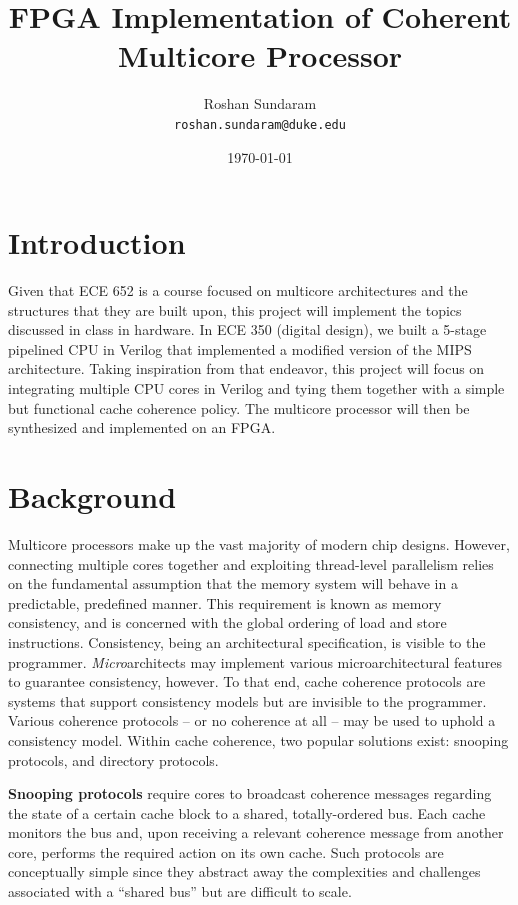 \documentclass[10pt]{article}
\title{FPGA Implementation of Coherent Multicore Processor}
\author{
    Roshan Sundaram \\
    \texttt{roshan.sundaram@duke.edu}
}
\date{\today}
\begin{document}
\maketitle

\begin{center}    



\end{center}


\section{Introduction}
Given that ECE 652 is a course focused on multicore architectures and the structures that they are built upon, this project will implement the topics discussed in class in hardware. In ECE 350 (digital design), we built a 5-stage pipelined CPU in Verilog that implemented a modified version of the MIPS architecture. Taking inspiration from that endeavor, this project will focus on integrating multiple CPU cores in Verilog and tying them together with a simple but functional cache coherence policy. The multicore processor will then be synthesized and implemented on an FPGA. 

\section{Background}
Multicore processors make up the vast majority of modern chip designs. However, connecting multiple cores together and exploiting thread-level parallelism relies on the fundamental assumption that the memory system will behave in a predictable, predefined manner. This requirement is known as memory consistency, and is concerned with the global ordering of load and store instructions. Consistency, being an architectural specification, is visible to the programmer. \textit{Micro}architects may implement various microarchitectural features to guarantee consistency, however. To that end, cache coherence protocols are systems that support consistency models but are invisible to the programmer. Various coherence protocols -- or no coherence at all -- may be used to uphold a consistency model. Within cache coherence, two popular solutions exist: snooping protocols, and directory protocols. 

\textbf{Snooping protocols} require cores to broadcast coherence messages regarding the state of a certain cache block to a shared, totally-ordered bus. Each cache monitors the bus and, upon receiving a relevant coherence message from another core, performs the required action on its own cache. Such protocols are conceptually simple since they abstract away the complexities and challenges associated with a ``shared bus'' but are difficult to scale. 
\end{document}

